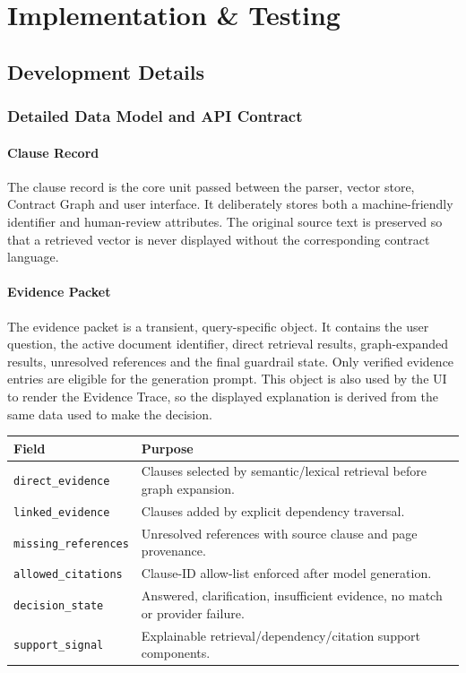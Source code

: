 \documentclass[12pt,a4paper,oneside]{report}
\begin{document}
\chapter{Implementation \& Testing}
\section{Development Details}
\subsection{Detailed Data Model and API Contract}

\subsubsection{Clause Record}
The clause record is the core unit passed between the parser, vector store, Contract Graph and user interface. It deliberately stores both a machine-friendly identifier and human-review attributes. The original source text is preserved so that a retrieved vector is never displayed without the corresponding contract language.



\subsubsection{Evidence Packet}
The evidence packet is a transient, query-specific object. It contains the user question, the active document identifier, direct retrieval results, graph-expanded results, unresolved references and the final guardrail state. Only verified evidence entries are eligible for the generation prompt. This object is also used by the UI to render the Evidence Trace, so the displayed explanation is derived from the same data used to make the decision.

\begin{longtable}{p{}p{}}
\toprule
\textbf{Field} & \textbf{Purpose}\\
\midrule
\texttt{direct\_evidence} & Clauses selected by semantic/lexical retrieval before graph expansion.\\
\texttt{linked\_evidence} & Clauses added by explicit dependency traversal.\\
\texttt{missing\_references} & Unresolved references with source clause and page provenance.\\
\texttt{allowed\_citations} & Clause-ID allow-list enforced after model generation.\\
\texttt{decision\_state} & Answered, clarification, insufficient evidence, no match or provider failure.\\
\texttt{support\_signal} & Explainable retrieval/dependency/citation support components.\\
\bottomrule
\end{longtable}
\end{document}
